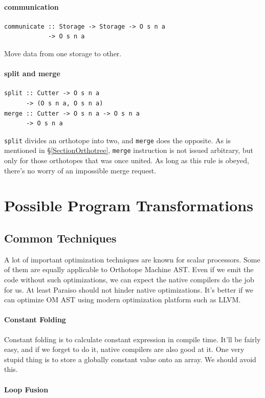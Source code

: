 \documentclass[twocolumn]{article}
\begin{document}
\paragraph{communication}
\begin{verbatim}
communicate :: Storage -> Storage -> O s n a
            -> O s n a
\end{verbatim}
Move data from one storage to other.

\paragraph{split and merge}
\begin{verbatim}
split :: Cutter -> O s n a
      -> (O s n a, O s n a)
merge :: Cutter -> O s n a -> O s n a
      -> O s n a
\end{verbatim}
{\tt split} divides an orthotope into two, and {\tt merge} does the opposite.
As is mentioned in \S\ref{SectionOrthotree}, {\tt merge} instruction is not
issued arbitrary, but only for those orthotopes that was once united. As long
as this rule is obeyed, there's no worry of an impossible merge request.

\section{Possible Program Transformations}
\subsection{Common Techniques}
A lot of important optimization techniques are known for scalar
processors. Some of them are equally applicable to Orthotope Machine
AST.  Even if we emit the code without such optimizations, we can
expect the native compilers do the job for us. At least Paraiso should
not hinder native optimizations. It's better if we can optimize OM AST
using modern optimization platform such as LLVM.

\paragraph{Constant Folding}
Constant folding is to calculate constant expression in compile
time. It'll be fairly easy, and if we forget to do it, native
compilers are also good at it. One very stupid thing is to store a
globally constant value onto an array. We should avoid this.

\paragraph{Loop Fusion}
\end{document}
